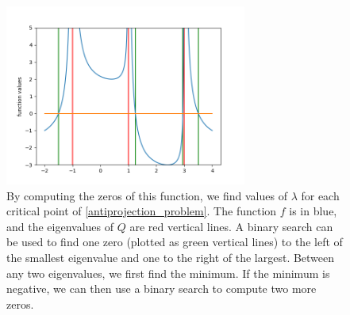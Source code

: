 \begin{figure}[ht]
    \centering
    \includegraphics[width=300px]{images/antiprojection.png}
    \caption[
    		The function whose zeros provide the largest ellipsoid.
		]{
    		By computing the zeros of this function, we find values of $\lambda$ for each critical point of \cref{antiprojection_problem}.
    		The function $f$ is in blue, and the eigenvalues of $Q$ are red vertical lines.
    		A binary search can be used to find one zero (plotted as green vertical lines) to the left of the smallest eigenvalue and one to the right of the largest.
    		Between any two eigenvalues, we first find the minimum.
    		If the minimum is negative, we can then use a binary search to compute two more zeros.
	}
    \label{antiprojection_image}
\end{figure}


